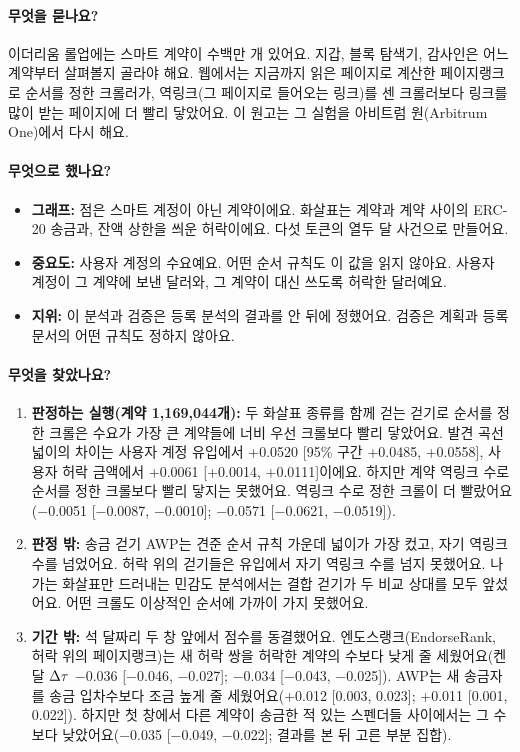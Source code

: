 \documentclass[11pt]{article}
\begin{document}
\paragraph{무엇을 묻나요?}
이더리움 롤업에는 스마트 계약이 수백만 개 있어요. 지갑, 블록 탐색기, 감사인은 어느 계약부터 살펴볼지 골라야 해요. 웹에서는 지금까지 읽은 페이지로 계산한 페이지랭크로 순서를 정한 크롤러가, 역링크(그 페이지로 들어오는 링크)를 센 크롤러보다 링크를 많이 받는 페이지에 더 빨리 닿았어요. 이 원고는 그 실험을 아비트럼 원(Arbitrum One)에서 다시 해요.

\paragraph{무엇으로 했나요?}
\begin{itemize}
\item \textbf{그래프:} 점은 스마트 계정이 아닌 계약이에요. 화살표는 계약과 계약 사이의 ERC-20 송금과, 잔액 상한을 씌운 허락이에요. 다섯 토큰의 열두 달 사건으로 만들어요.
\item \textbf{중요도:} 사용자 계정의 수요예요. 어떤 순서 규칙도 이 값을 읽지 않아요. 사용자 계정이 그 계약에 보낸 달러와, 그 계약이 대신 쓰도록 허락한 달러예요.
\item \textbf{지위:} 이 분석과 검증은 등록 분석의 결과를 안 뒤에 정했어요. 검증은 계획과 등록 문서의 어떤 규칙도 정하지 않아요.
\end{itemize}

\paragraph{무엇을 찾았나요?}
\begin{enumerate}
\item \textbf{판정하는 실행(계약 1,169,044개):} 두 화살표 종류를 함께 걷는 걷기로 순서를 정한 크롤은 수요가 가장 큰 계약들에 너비 우선 크롤보다 빨리 닿았어요. 발견 곡선 넓이의 차이는 사용자 계정 유입에서 +0.0520 [95\% 구간 +0.0485, +0.0558], 사용자 허락 금액에서 +0.0061 [+0.0014, +0.0111]이에요. 하지만 계약 역링크 수로 순서를 정한 크롤보다 빨리 닿지는 못했어요. 역링크 수로 정한 크롤이 더 빨랐어요(−0.0051 [−0.0087, −0.0010]; −0.0571 [−0.0621, −0.0519]).
\item \textbf{판정 밖:} 송금 걷기 AWP는 견준 순서 규칙 가운데 넓이가 가장 컸고, 자기 역링크 수를 넘었어요. 허락 위의 걷기들은 유입에서 자기 역링크 수를 넘지 못했어요. 나가는 화살표만 드러내는 민감도 분석에서는 결합 걷기가 두 비교 상대를 모두 앞섰어요. 어떤 크롤도 이상적인 순서에 가까이 가지 못했어요.
\item \textbf{기간 밖:} 석 달짜리 두 창 앞에서 점수를 동결했어요. 엔도스랭크(EndorseRank, 허락 위의 페이지랭크)는 새 허락 쌍을 허락한 계약의 수보다 낮게 줄 세웠어요(켄달 $\Delta\tau$ −0.036 [−0.046, −0.027]; −0.034 [−0.043, −0.025]). AWP는 새 송금자를 송금 입차수보다 조금 높게 줄 세웠어요(+0.012 [0.003, 0.023]; +0.011 [0.001, 0.022]). 하지만 첫 창에서 다른 계약이 송금한 적 있는 스펜더들 사이에서는 그 수보다 낮았어요(−0.035 [−0.049, −0.022]; 결과를 본 뒤 고른 부분 집합).
\end{enumerate}
\end{document}
